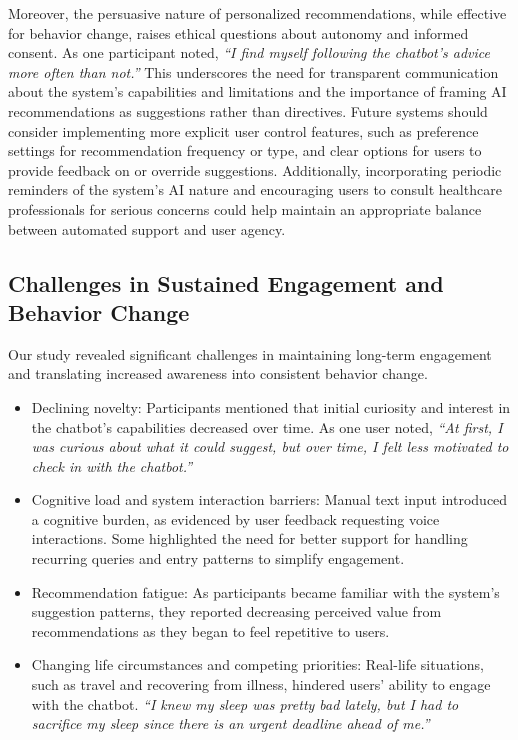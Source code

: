 Moreover, the persuasive nature of personalized recommendations, while effective for behavior change, raises ethical questions about autonomy and informed consent. As one participant noted, \textit{``I find myself following the chatbot's advice more often than not.''} This underscores the need for transparent communication about the system's capabilities and limitations and the importance of framing AI recommendations as suggestions rather than directives.
Future systems should consider implementing more explicit user control features, such as preference settings for recommendation frequency or type, and clear options for users to provide feedback on or override suggestions. Additionally, incorporating periodic reminders of the system's AI nature and encouraging users to consult healthcare professionals for serious concerns could help maintain an appropriate balance between automated support and user agency.


\subsection{Challenges in Sustained Engagement and Behavior Change}
Our study revealed significant challenges in maintaining long-term engagement and translating increased awareness into consistent behavior change. 
\begin{itemize}
    \item Declining novelty: Participants mentioned that initial curiosity and interest in the chatbot's capabilities decreased over time. As one user noted, \textit{``At first, I was curious about what it could suggest, but over time, I felt less motivated to check in with the chatbot.''}
    \item Cognitive load and system interaction barriers: 
    Manual text input introduced a cognitive burden, as evidenced by user feedback requesting voice interactions. Some highlighted the need for better support for handling recurring queries and entry patterns to simplify engagement.
    \item Recommendation fatigue: As participants became familiar with the system's suggestion patterns, they reported decreasing perceived value from recommendations as they began to feel repetitive to users.
    \item Changing life circumstances and competing priorities: Real-life situations, such as travel and recovering from illness, hindered users' ability to engage with the chatbot. 
    \textit{``I knew my sleep was pretty bad lately, but I had to sacrifice my sleep since there is an urgent deadline ahead of me.''}
\end{itemize}

